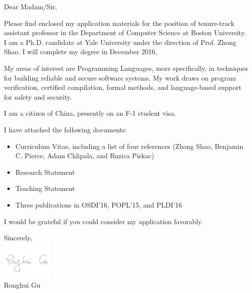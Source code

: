 \documentclass{letter}
\date{December 1, 2016}
\makeatletter
\newcommand{\subject}[1]{\def\@subject{{\centering{#1}}}}
\makeatother
\begin{document}
\begin{letter}{}

\subject{\begin{center} Re: Application for the position of tenure-track assistant professor\end{center}}


\opening{Dear Madam/Sir,}
Please find enclosed my application materials for the position of
tenure-track assistant professor in the Department of Computer Science at Boston University. 
I am a Ph.D. candidate at Yale University under
the direction of Prof. Zhong Shao. I will complete my degree in December 2016.


My areas of interest are Programming Languages, 
more specifically, in techniques for building reliable and secure software systems. My work draws on program verification,
certified compilation, formal methods, and language-based support for safety and security.

I am a citizen of China, presently on an F-1 student visa.

I have attached the following documents:
\begin{itemize}
\item  Curriculum Vitae, including a list of four references (Zhong Shao, Benjamin C. Pierce, Adam Chlipala, and Ruzica Piskac)
\item Research Statement
\item Teaching Statement 
\item Three publications in OSDI'16, POPL'15, and PLDI'16
\end{itemize}

I would be grateful if you could consider my application favorably.




\closing{Sincerely,\\
\vspace{3pt}
\includegraphics[width=2.5cm]{signature.pdf}\\
Ronghui Gu
}

\end{letter}
\end{document}
